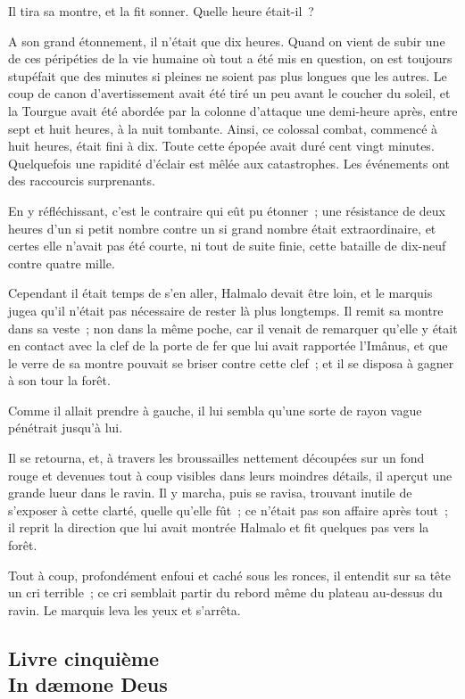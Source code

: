 \documentclass[french,twoside]{book} %
\begin{document}
Il tira sa montre, et la fit sonner. Quelle heure était-il ?\par
A son grand étonnement, il n’était que dix heures. Quand on vient de subir une de ces péripéties de la vie humaine où tout a été mis en question, on est toujours stupéfait que des minutes si pleines ne soient pas plus longues que les autres. Le coup de canon d’avertissement avait été tiré un peu avant le coucher du soleil, et la Tourgue avait été abordée par la colonne d’attaque une demi-heure après, entre sept et huit heures, à la nuit tombante. Ainsi, ce colossal combat, commencé à huit heures, était fini à dix. Toute cette épopée avait duré cent vingt minutes. Quelquefois une rapidité d’éclair est mêlée aux catastrophes. Les événements ont des raccourcis surprenants.\par
En y réfléchissant, c’est le contraire qui eût pu étonner ; une résistance de deux heures d’un si petit nombre contre un si grand nombre était extraordinaire, et certes elle n’avait pas été courte, ni tout de suite finie, cette bataille de dix-neuf contre quatre mille.\par
 Cependant il était temps de s’en aller, Halmalo devait être loin, et le marquis jugea qu’il n’était pas nécessaire de rester là plus longtemps. Il remit sa montre dans sa veste ; non dans la même poche, car il venait de remarquer qu’elle y était en contact avec la clef de la porte de fer que lui avait rapportée l’Imânus, et que le verre de sa montre pouvait se briser contre cette clef ; et il se disposa à gagner à son tour la forêt.\par
Comme il allait prendre à gauche, il lui sembla qu’une sorte de rayon vague pénétrait jusqu’à lui.\par
Il se retourna, et, à travers les broussailles nettement découpées sur un fond rouge et devenues tout à coup visibles dans leurs moindres détails, il aperçut une grande lueur dans le ravin. Il y marcha, puis se ravisa, trouvant inutile de s’exposer à cette clarté, quelle qu’elle fût ; ce n’était pas son affaire après tout ; il reprit la direction que lui avait montrée Halmalo et fit quelques pas vers la forêt.\par
Tout à coup, profondément enfoui et caché sous les ronces, il entendit sur sa tête un cri terrible ; ce cri semblait partir du rebord même du plateau au-dessus du ravin. Le marquis leva les yeux et s’arrêta.\par
  \subsection[{Livre cinquième. In dæmone Deus}]{Livre cinquième \\
In dæmone Deus}
\label{p3l5}
\end{document}
